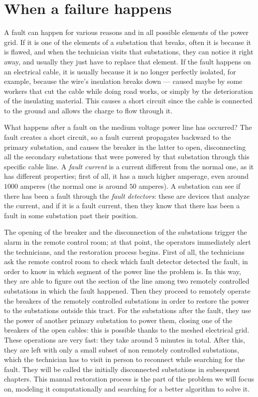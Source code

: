 \section{When a failure happens}

A fault can happen for various reasons and in all possible elements of the power grid. If it is one of the elements of a substation that breaks, often it is because it is flawed, and when the technician visits that substations, they can notice it right away, and usually they just have to replace that element. If the fault happens on an electrical cable, it is usually because it is no longer perfectly isolated, for example, because the wire's insulation breaks down --- caused maybe by some workers that cut the cable while doing road works, or simply by the deterioration of the insulating material. This causes a short circuit since the cable is connected to the ground and allows the charge to flow through it.

What happens after a fault on the medium voltage power line has occurred? The fault creates a short circuit, so a fault current propagates backward to the primary substation, and causes the breaker in the latter to open, disconnecting all the secondary substations that were powered by that substation through this specific cable line. A \emph{fault current} is a current different from the normal one, as it has different properties; first of all, it has a much higher amperage, even around $1000$ amperes (the normal one is around $50$ amperes). A substation can see if there has been a fault through the \emph{fault detectors}: these are devices that analyze the current, and if it is a fault current, then they know that there has been a fault in some substation past their position.

The opening of the breaker and the disconnection of the substations trigger the alarm in the remote control room; at that point, the operators immediately alert the technicians, and the restoration process begins. First of all, the technicians ask the remote control room to check which fault detector detected the fault, in order to know in which segment of the power line the problem is. In this way, they are able to figure out the section of the line among two remotely controlled substations in which the fault happened. Then they proceed to remotely operate the breakers of the remotely controlled substations in order to restore the power to the substations outside this tract. For the substations after the fault, they use the power of another primary substation to power them, closing one of the breakers of the open cables: this is possible thanks to the meshed electrical grid. These operations are very fast: they take around $5$ minutes in total. After this, they are left with only a small subset of non remotely controlled substations, which the technician has to visit in person to reconnect while searching for the fault. They will be called the initially disconnected substations in subsequent chapters. This manual restoration process is the part of the problem we will focus on, modeling it computationally and searching for a better algorithm to solve it.


